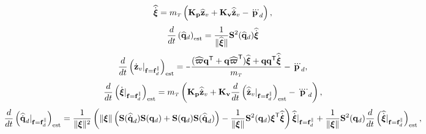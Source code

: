 \documentclass[journal,onecolumn]{IEEEtran}
\newcommand{\minus}{\scalebox{0.75}[1.0]{$-$}}
\begin{document}
	\begin{equation}
		\widehat{\dot{\Xiq}} = \mT\LP{\bf K_p} \zvhat +  {\bf K_v} \zvdothat - \pLdtdot\RP,
	\end{equation}
	\begin{equation}
		\frac{d}{dt}\LP\qdhat\RP_{\text{est}} = \frac{1}{\|\widehat{\Xiq}\|}\Skew[2]{\qdhat}\widehat{\dot{\Xiq}}
	\end{equation}
	\begin{equation}
		\frac{d}{dt}\LP\zvdot|_{\f=\fd^{\|}}\RP_{\text{est}} = \minus\frac{(\widehat{\bs{\varpi}}\dir[T] + \dir\widehat{\bs{\varpi}}\trs)\widehat{\Xiq} + \dir\dir[T]\widehat{\dot{\Xiq}}}{\mT} - \pLdtdot,
	\end{equation}
	\begin{equation}
		\frac{d}{dt}\LP\dot{\Xiq}|_{\f=\fd^{\|}}\RP_{\text{est}} = \mT\left( {\bf K_p} \zvdothat
		+ {\bf K_v} \frac{d}{dt}\LP\zvdothatdot|_{\f=\fd^{\|}}\RP_{\text{est}}
		- \pLdqdot\right),
	\end{equation}
	\begin{equation}
		\frac{d}{dt}\LP\qddothat|_{\f=\f_d^{\|}}\RP_{\text{est}} = \frac{1}{\|\Xiq\|^2}\LP\|\Xiq\|\LP\Skew{\qddothat}\Skew{\dird}+\Skew{\dird}\Skew{\qddothat}\RP-\frac{1}{\|\Xiq\|}\Skew[2]{\dird}\Xiq[T]\widehat{\dot{\Xiq}}\RP\widehat{\dot{\Xiq}}|_{\f=\fd^{\|}}+\frac{1}{\|\Xiq\|}\Skew[2]{\dird}\frac{d}{dt}\LP\widehat{\dot{\Xiq}}|_{\f=\fd^{\|}}\RP_{\text{est}},
	\end{equation}
\end{document}

